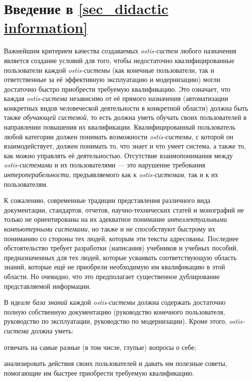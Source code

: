 \section*{Введение в \ref{sec_didactic information}}
Важнейшим критерием качества создаваемых \textit{ostis-систем} любого назначения является создание условий для того, чтобы недостаточно квалифицированные пользователи каждой \textit{ostis-системы} (как конечные пользователи, так и ответственные за её эффективную эксплуатацию и модернизацию) могли достаточно быстро   приобрести требуемую квалификацию. Это означает, что каждая \textit{ostis-система} независимо от её прямого назначения (автоматизации конкретных видов человеческой деятельности в конкретной области) должна быть также \textit{обучающей системой}, то есть должна уметь обучать своих пользователей в направлении повышения их квалификации. Квалифицированный пользователь любой категории должен понимать возможности \textit{ostis-системы}, с которой он взаимодействует, должен понимать то, что знает и что умеет система, а также то, как можно управлять её деятельностью. Отсутствие взаимопонимания между \textit{ostis-системами} и их пользователями --- это нарушение требования \textit{интероперабельности}, предъявляемого как к \textit{ostis-системам}, так и к их пользователям.

К сожалению, современные традиции представления различного вида документации, стандартов, отчетов, научно-технических статей и монографий не только не ориентированы на их адекватное понимание \textit{интеллектуальными компьютерными системами}, но также и не способствуют быстрому их пониманию со стороны тех людей, которым эти тексты адресованы. Последнее обстоятельство требует разработки (написания) учебников и учебных пособий,  предназначенных для тех людей, которые  усваивать соответствующую область знаний, которые ещё не приобрели необходимую им квалификацию в этой области. Но очевидно, что это предполагает существенное дублирование представляемой информации.

В идеале \textit{база знаний} каждой \textit{ostis-системы} должна содержать достаточно полную собственную документацию (руководство конечного пользователя, руководство по эксплуатации, руководство по модернизации). Кроме этого, \textit{ostis-система} должна уметь:
\begin{textitemize}
	\item отвечать на самые разные (в том числе, глупые) вопросы о себе;
	\item анализировать действия своих пользователей и давать им полезные советы, помогающие им быстрее приобрести требуемую квалификацию.
\end{textitemize}

